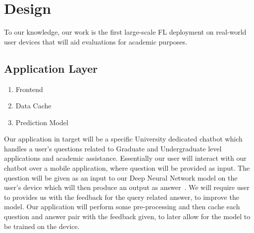 \section{Design}
    To our knowledge, our work is the first large-scale FL deployment on real-world user devices that will aid evaluations for academic purposes.

    \subsection{Application Layer}
        \begin{enumerate}
            \item Frontend
            \item Data Cache
            \item Prediction Model
            \newline
        \end{enumerate}

        Our application in target will be a specific University dedicated chatbot which handles a user's questions related to Graduate and Undergraduate level applications and academic assistance. Essentially our user will interact with our chatbot over a mobile application, where question will be provided as input. The question will be given as an input to our Deep Neural Network model on the user's device which will then produce an output as answer~\cite{9225395}. We will require user to provides us with the feedback for the query related answer, to improve the model. Our application will perform some pre-processing and then cache each question and answer pair with the feedback given, to later allow for the model to be trained on the device.
    
